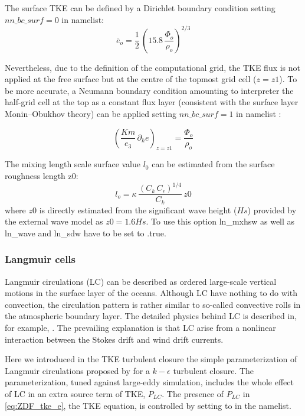 \documentclass[../main/NEMO_manual]{subfiles}
\begin{document}
The surface TKE can be defined by a Dirichlet boundary condition setting $nn\_bc\_surf=0$ in  namelist:
\begin{equation}
  \bar{e}_o  = \frac{1}{2}\,\left( 15.8 \, \frac{\Phi_o}{\rho_o}\right) ^{2/3}
\end{equation}

Nevertheless, due to the definition of the computational grid, the TKE flux is not applied at the free surface but at the centre of the topmost grid cell ($z = z1$). To be more accurate, a Neumann boundary condition amounting to interpreter the half-grid cell at the top as a constant flux layer (consistent with the surface layer Monin–Obukhov theory) can be applied setting $nn\_bc\_surf=1$ in   namelist \citep{couvelard_2020}:

\begin{equation}
  \left(\frac{Km}{e_3}\,\partial_k e \right)_{z=z1} = \frac{\Phi_o}{\rho_o}
\end{equation}


The mixing length scale surface value $l_0$ can be estimated from the surface roughness length z0:
\begin{equation}
  l_o = \kappa \, \frac{ \left( C_k\,C_\epsilon \right) ^{1/4}}{C_k}\, z0
\end{equation}
where $z0$ is directly estimated from the significant wave height ($Hs$) provided by the external wave model as $z0=1.6Hs$. To use this option ln\_mxhsw as well as ln\_wave and ln\_sdw have to be set to .true.

\subsubsection{Langmuir cells}
\label{subsubsec:ZDF_tke_langmuir}

Langmuir circulations (LC) can be described as ordered large-scale vertical motions in
the surface layer of the oceans.
Although LC have nothing to do with convection, the circulation pattern is rather similar to
so-called convective rolls in the atmospheric boundary layer.
The detailed physics behind LC is described in, for example, \citet{craik.leibovich_JFM76}.
The prevailing explanation is that LC arise from a nonlinear interaction between the Stokes drift and
wind drift currents.

Here we introduced in the TKE turbulent closure the simple parameterization of Langmuir circulations proposed by
\citep{axell_JGR02} for a $k-\epsilon$ turbulent closure.
The parameterization, tuned against large-eddy simulation, includes the whole effect of LC in
an extra source term of TKE, $P_{LC}$.
The presence of $P_{LC}$ in \autoref{eq:ZDF_tke_e}, the TKE equation, is controlled by setting  to
 in the  namelist.
\end{document}
